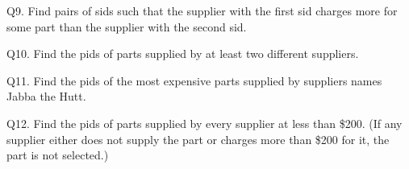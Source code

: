 \SOLUTION


\newpage
Q9.
Find pairs of sids such that the supplier with the first
sid charges more for some part than the supplier with the second sid.

\SOLUTION


\newpage
Q10.
Find the pids of parts supplied by at least two different suppliers.

\SOLUTION


\newpage
Q11.
Find the pids of the most expensive parts supplied by suppliers
names Jabba the Hutt.

\SOLUTION


\newpage
Q12.
Find the pids of parts supplied by every supplier at less than \$200.
(If any supplier either does not supply the part
or
charges more than \$200 for it, the part is not selected.)

\SOLUTION




